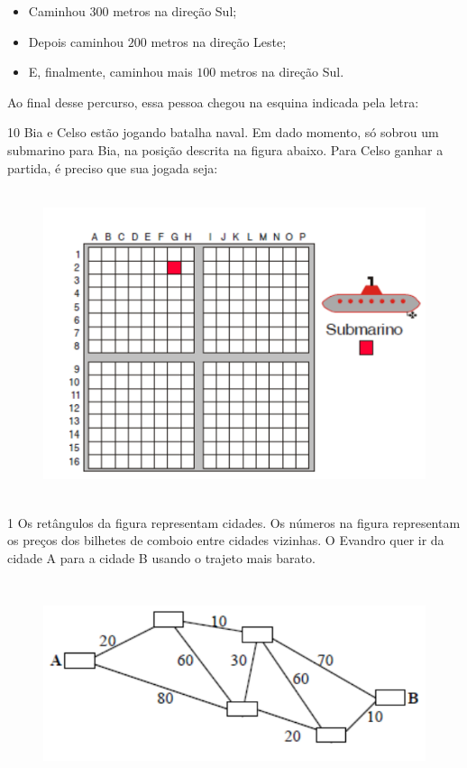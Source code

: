 {\begin{itemize}
\item Caminhou $300$ metros na direção Sul;
\item Depois caminhou $200$ metros na direção Leste;
\item E, finalmente, caminhou mais $100$ metros na direção Sul.
\end{itemize}

Ao final desse percurso, essa pessoa chegou na esquina indicada pela
letra: 

\num{10} Bia e Celso estão jogando batalha naval. Em dado momento, só sobrou
um submarino para Bia, na posição descrita na figura abaixo. Para Celso ganhar a partida, é preciso que sua jogada seja:

\begin{figure}
\includegraphics[width=5in,height=3.55208in]{./imgSAEB_6_MAT/media/image73.png}
\end{figure}



\num{1}  Os retângulos da figura representam cidades. Os números na figura
representam os preços dos bilhetes de comboio entre cidades vizinhas. O
Evandro quer ir da cidade A para a cidade B usando o trajeto mais
barato.

\begin{figure}
\includegraphics[width=5.90625in,height=2.38542in]{./imgSAEB_6_MAT/media/image74.png}
\end{figure}

}
